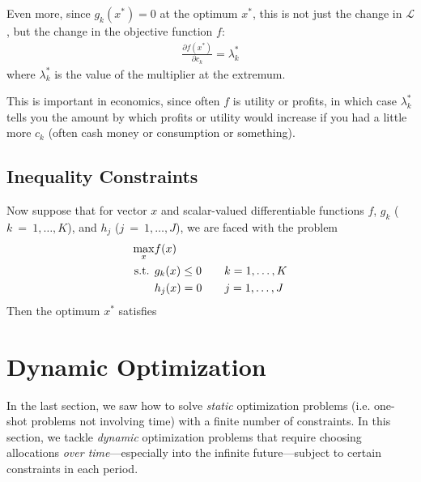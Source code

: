 \documentclass[12pt]{article}
\numberwithin{equation}{section} %
\theoremstyle{plain}
\theoremstyle{definition}
\theoremstyle{remark}
\begin{document}
Even more, since $g_k(x^*)=0$ at the optimum $x^*$, this is not just the
change in $\mathscr{L}$, but the change in the objective function $f$:
\begin{align*}
  \frac{\partial f(x^*)}{\partial c_k} = \lambda^*_k
\end{align*}
where $\lambda^*_k$ is the value of the multiplier at the extremum.

This is important in economics, since often $f$ is utility or profits,
in which case $\lambda^*_k$ tells you the amount by which profits or
utility would increase if you had a little more $c_k$ (often cash money
or consumption or something).

\subsection{Inequality Constraints}

Now suppose that for vector $x$ and scalar-valued differentiable
functions $f$, $g_k$ ($k~=~1,\ldots,K$), and $h_j$ ($j~=~1,\ldots,J$),
we are faced with the problem
\begin{align}
  \max_x &f(x) \label{prob:ineqconst}\\
  \text{s.t. } &g_k(x) \leq 0 \qquad k=1,\ldots,K\notag\\
               &h_j(x) =0 \qquad j=1,\ldots,J\notag
\end{align}
Then the optimum $x^*$ satisfies


\clearpage
\section{Dynamic Optimization}

In the last section, we saw how to solve \emph{static} optimization
problems (i.e. one-shot problems not involving time) with a finite
number of constraints.
In this section, we tackle \emph{dynamic} optimization problems that
require choosing allocations \emph{over time}---especially into the
infinite future---subject to certain constraints in each period.
\end{document}
